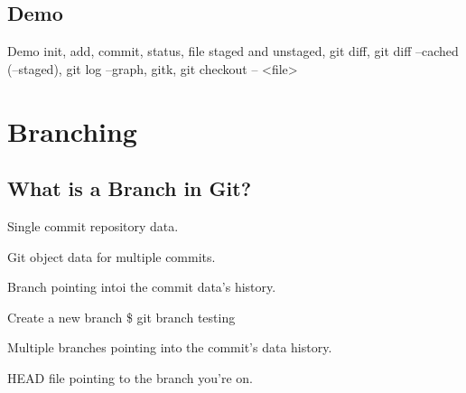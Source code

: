 \documentclass{beamer}
\begin{document}
\subsection{Demo}

\begin{frame}{Demo}
 init, add, commit, status, file staged and unstaged, git diff, git diff --cached (--staged), git log --graph, gitk, git checkout -- <file>
\end{frame}

\section{Branching}

\subsection{What is a Branch in Git?}

\begin{frame}{Single commit repository data.}
    \centering
    \hfill\vfill
\end{frame}

\begin{frame}{Git object data for multiple commits.}
    \centering
    \hfill\vfill
\end{frame}

\begin{frame}{Branch pointing intoi the commit data's history.}
    \centering
    \hfill\vfill
\end{frame}

\begin{frame}{Create a new branch}
  \$ git branch testing
\end{frame}

\begin{frame}{Multiple branches pointing into the commit's data history.}
    \centering
    \hfill\vfill
\end{frame}

\begin{frame}{HEAD file pointing to the branch you're on.}
    \centering
    \hfill\vfill
\end{frame}
\end{document}
